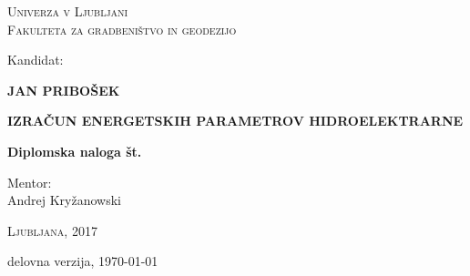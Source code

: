 \thispagestyle{empty}

\begin{center}
\vspace*{-1.5 cm}
\textsc{Univerza v Ljubljani}\\
\textsc{Fakulteta za gradbeništvo in geodezijo}

\vspace*{5cm}
Kandidat:\\
\vspace*{0.5cm}
\begin{large}
\textbf{JAN PRIBOŠEK}
\end{large}

\vspace*{1cm}

\begin{Large}
\textbf{IZRAČUN ENERGETSKIH PARAMETROV HIDROELEKTRARNE}
\end{Large}

\vspace*{1cm}

\begin{large}
\textbf{Diplomska naloga št.}
\end{large}
\vspace*{10cm}

\begin{large}
Mentor:\\ Andrej Kryžanowski
\end{large}
\textsc{Ljubljana, 2017}

\vspace*{1cm}
delovna verzija, \today

\end{center}


\newpage
\thispagestyle{empty}
\cleardoublepage